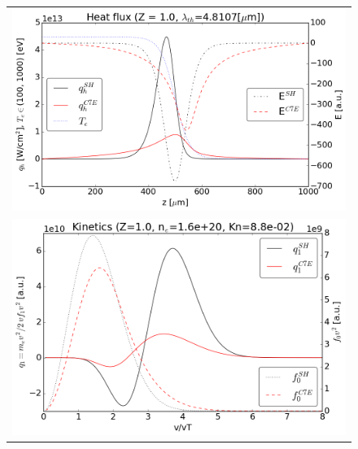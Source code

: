 \documentclass[preprint,12pt]{elsarticle}
\begin{document}
\begin{figure}[tbh]
  \begin{center}
    \begin{tabular}{c}
      \includegraphics[width=1.0\textwidth]{../results/fe_analysis/C7E/P5_heatflux_Z1_fifthF.png} \\ 
      \includegraphics[width=1.0\textwidth]{../results/fe_analysis/C7E/P5_kinetics_Z1_fifthF.png}
    \end{tabular}
  \caption{
  }
  \end{center}
  \label{fig:AWBScorrection_f1}
\end{figure}
\end{document}
